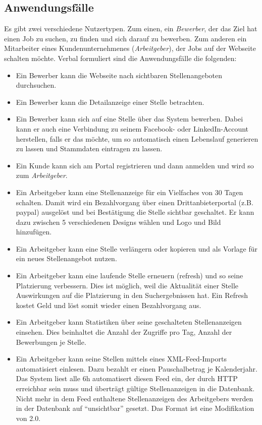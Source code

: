 \subsection{Anwendungsfälle}
Es gibt zwei verschiedene Nutzertypen. Zum einen, ein \textit{Bewerber}, der das Ziel hat einen Job zu suchen, zu finden und sich darauf zu bewerben. Zum anderen ein Mitarbeiter eines Kundenunternehmenes (\textit{Arbeitgeber}), der Jobs auf der Webseite schalten möchte.
Verbal formuliert sind die Anwendungsfälle die folgenden:
\begin{itemize}
 \item Ein Bewerber kann die Webseite nach sichtbaren Stellenangeboten durchsuchen.
 \item Ein Bewerber kann die Detailanzeige einer Stelle betrachten.
 \item Ein Bewerber kann sich auf eine Stelle über das System bewerben. Dabei kann er auch eine Verbindung zu seinem Facebook- oder LinkedIn-Account herstellen, falls er das möchte, um so automatisch einen Lebenslauf generieren zu lassen und Stammdaten eintragen zu lassen.
 \item Ein Kunde kann sich am Portal registrieren und dann anmelden und wird so zum \textit{Arbeitgeber}.
 \item Ein Arbeitgeber kann eine Stellenanzeige für ein Vielfaches von 30 Tagen schalten. Damit wird ein Bezahlvorgang über einen Drittanbieterportal (z.B. paypal) ausgelöst und bei Bestätigung die Stelle sichtbar geschaltet. Er kann dazu zwischen 5 verschiedenen Designs wählen und Logo und Bild hinzufügen.
 \item Ein Arbeitgeber kann eine Stelle verlängern oder kopieren und als Vorlage für ein neues Stellenangebot nutzen.
 \item Ein Arbeitgeber kann eine laufende Stelle erneuern (refresh) und so seine Platzierung verbessern. Dies ist möglich, weil die Aktualität einer Stelle Auswirkungen auf die Platzierung in den Suchergebnissen hat. Ein Refresh kostet Geld und löst somit wieder einen Bezahlvorgang aus.
 \item Ein Arbeitgeber kann Statistiken über seine geschalteten Stellenanzeigen einsehen. Dies beinhaltet die Anzahl der Zugriffe pro Tag, Anzahl der Bewerbungen je Stelle.
 \item Ein Arbeitgeber kann seine Stellen mittels eines XML-Feed-Imports automatisiert einlesen. Dazu bezahlt er einen Pauschalbetrag je Kalenderjahr. Das System liest alle 6h automatisert diesen Feed ein, der durch HTTP erreichbar sein muss und überträgt gültige Stellenanzeigen in die Datenbank. Nicht mehr in dem Feed enthaltene Stellenanzeigen des Arbeitgebers werden in der Datenbank auf "`unsichtbar"' gesetzt. Das Format ist eine Modifikation von  2.0.
\end{itemize}



